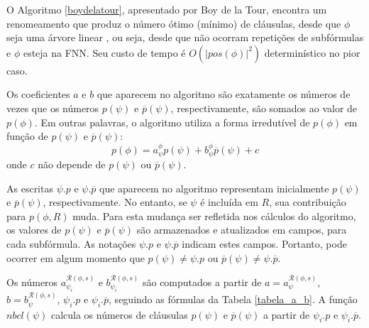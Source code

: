 O Algoritmo \ref{boydelatour}, apresentado por Boy de la Tour, encontra um renomeamento que produz o número ótimo (mínimo) de cláusulas, desde que $\phi$ seja uma árvore linear \cite{de1992optimality}, ou seja, desde que não ocorram repetições de subfórmulas e $\phi$ esteja na FNN. Seu custo de tempo é $O(|pos(\phi)|^2)$ determinístico no pior caso.

Os coeficientes $a$ e $b$ que aparecem no algoritmo são exatamente os números de vezes que os números $p(\psi)$ e $\overline{p}(\psi)$, respectivamente, são somados ao valor de $p(\phi)$. Em outras palavras, o algoritmo utiliza a forma irredutível de $p(\phi)$ em função de $p(\psi)$ e $\overline{p}(\psi)$: $$p(\phi) = a_\psi^\phi p(\psi) + b_\psi^\phi \overline{p}(\psi) + c$$ onde $c$ não depende de $p(\psi)$ ou $\overline{p}(\psi)$.

As escritas $\psi.p$ e $\psi.\overline{p}$ que aparecem no algoritmo representam inicialmente $p(\psi)$ e $\overline{p}(\psi)$, respectivamente. No entanto, se $\psi$ é incluída em $R$, sua contribuição para $p(\phi,R)$ muda. Para esta mudança ser refletida nos cálculos do algoritmo, os valores de $p(\psi)$ e $\overline{p}(\psi)$ são armazenados e atualizados em campos, para cada subfórmula. As notações $\psi.p$ e $\psi.\overline{p}$ indicam estes campos. Portanto, pode ocorrer em algum momento que $p(\psi) \neq \psi.p$ ou $\overline{p}(\psi) \neq \psi.\overline{p}$.

Os números $a_{\psi_i}^{\mathcal{R}(\phi,s)}$ e $b_{\psi_i}^{\mathcal{R}(\phi,s)}$ são computados a partir de $a = a_\psi^{\mathcal{R}(\phi,s)}$, $b = b_\psi^{\mathcal{R}(\phi,s)}$, $\psi_i.p$ e $\psi_i.\overline{p}$, seguindo as fórmulas da Tabela \ref{tabela_a_b}. A função $nbcl(\psi)$ calcula os números de cláusulas $p(\psi)$ e $\overline{p}(\psi)$ a partir de $\psi_i.p$ e $\psi_i.\overline{p}$.


